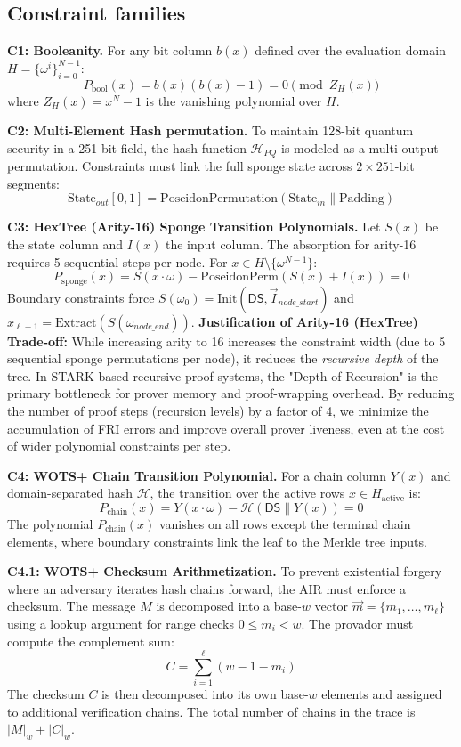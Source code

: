 \documentclass[conference]{IEEEtran}
\theoremstyle{definition}
\theoremstyle{plain}
\theoremstyle{remark}
\newcommand{\concat}{\mathbin{\|}}
\newcommand{\Hash}{\mathcal{H}}
\begin{document}
\subsection*{Constraint families}

\textbf{C1: Booleanity.} For any bit column $b(x)$ defined over the evaluation domain $H = \{\omega^i\}_{i=0}^{N-1}$:
\[
P_{\text{bool}}(x) = b(x)(b(x)-1) = 0 \pmod{Z_H(x)}
\]
where $Z_H(x) = x^N - 1$ is the vanishing polynomial over $H$.

\textbf{C2: Multi-Element Hash permutation.} To maintain 128-bit quantum security in a 251-bit field, the hash function $\Hash_{PQ}$ is modeled as a multi-output permutation. Constraints must link the full sponge state across $2 \times 251$-bit segments:
\[
\text{State}_{out}[0,1] = \text{PoseidonPermutation}(\text{State}_{in} \concat \text{Padding})
\]

\textbf{C3: HexTree (Arity-16) Sponge Transition Polynomials.}
Let $S(x)$ be the state column and $I(x)$ the input column. The absorption for arity-16 requires 5 sequential steps per node. For $x \in H \setminus \{\omega^{N-1}\}$:
\begin{equation}
    P_{\text{sponge}}(x) = S(x \cdot \omega) - \text{PoseidonPerm}(S(x) + I(x)) = 0
\end{equation}
Boundary constraints force $S(\omega_0) = \text{Init}(\textsf{DS}, \vec{I}_{node\_start})$ and $x_{\ell+1} = \text{Extract}(S(\omega_{node\_end}))$.
\textbf{Justification of Arity-16 (HexTree) Trade-off:} While increasing arity to 16 increases the constraint width (due to 5 sequential sponge permutations per node), it reduces the \textit{recursive depth} of the tree. In STARK-based recursive proof systems, the "Depth of Recursion" is the primary bottleneck for prover memory and proof-wrapping overhead. By reducing the number of proof steps (recursion levels) by a factor of 4, we minimize the accumulation of FRI errors and improve overall prover liveness, even at the cost of wider polynomial constraints per step.

\textbf{C4: WOTS+ Chain Transition Polynomial.}
For a chain column $Y(x)$ and domain-separated hash $\Hash$, the transition over the active rows $x \in H_{\text{active}}$ is:
\[
P_{\text{chain}}(x) = Y(x \cdot \omega) - \Hash(\textsf{DS} \concat Y(x)) = 0
\]
The polynomial $P_{\text{chain}}(x)$ vanishes on all rows except the terminal chain elements, where boundary constraints link the leaf to the Merkle tree inputs.

\textbf{C4.1: WOTS+ Checksum Arithmetization.}
To prevent existential forgery where an adversary iterates hash chains forward, the AIR must enforce a checksum. The message $M$ is decomposed into a base-$w$ vector $\vec{m} = \{m_1, \dots, m_\ell\}$ using a lookup argument for range checks $0 \leq m_i < w$. The provador must compute the complement sum:
\begin{equation}
    C = \sum_{i=1}^{\ell} (w - 1 - m_i)
\end{equation}
The checksum $C$ is then decomposed into its own base-$w$ elements and assigned to additional verification chains. The total number of chains in the trace is $|M|_w + |C|_w$.
\end{document}
